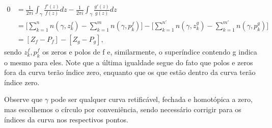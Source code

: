 \documentclass[ComplexAnalysis/complex.tex]{subfiles}
\begin{document}
\begin{proof*}
	\begin{align*}
		0 & = \frac{1}{2\pi i}\int_{\gamma }^{}\frac{f'(z)}{f(z)}dz - \frac{1}{2\pi i}\int_{\gamma }^{}\frac{g'(z)}{g(z)}dz                                                                                                   \\
		  & = \biggl[\sum\limits_{k=1}^{n}n(\gamma , z_{k}^{f}) - \sum\limits_{k=1}^{m}n(\gamma , p_{k}^{f})\biggr] - \biggl[\sum\limits_{k=1}^{n'}n(\gamma , z_{k}^{g}) - \sum\limits_{k=1}^{m'}n(\gamma , p_{k}^{g})\biggr] \\
		  & = [Z_{f} - P_{f}] - [Z_{g} - P_{g}],
	\end{align*}
	sendo \(z_{k}^{f}, p_{k}^{f}\) os zeros e polos de f e, similarmente, o superíndice contendo g indica o mesmo para eles. Note que a última igualdade segue do fato que polos e zeros fora da curva terão índice zero, enquanto
	que os que estão dentro da curva terão índice zero. \qedsymbol
\end{proof*}
Observe que \(\gamma \) pode ser qualquer curva retificável, fechada e homotópica a zero, mas escolhemos o círculo por conveniência, sendo necessário
corrigir para os índices da curva nos respectivos pontos.
\end{document}

